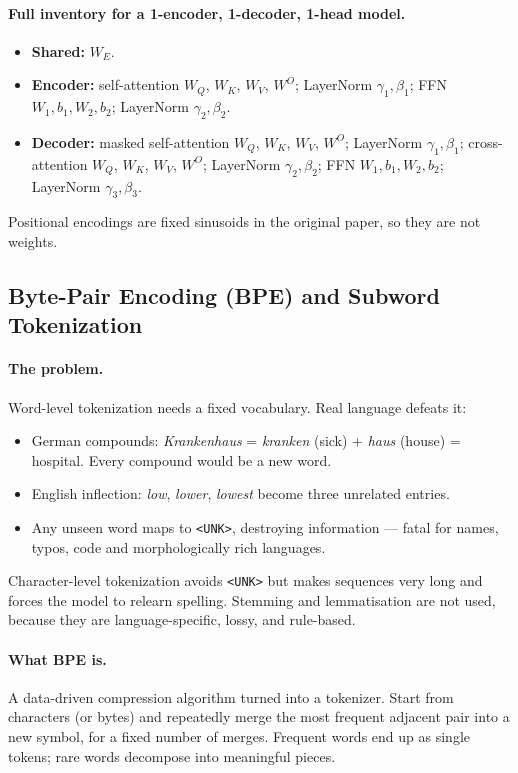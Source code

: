 \documentclass[11pt,a4paper]{article}
\begin{document}
\paragraph{Full inventory for a 1-encoder, 1-decoder, 1-head model.}
\begin{itemize}
\item \textbf{Shared:} $W_E$.
\item \textbf{Encoder:} self-attention $W_Q$, $W_K$, $W_V$, $W^O$; LayerNorm
  $\gamma_1, \beta_1$; FFN $W_1, b_1, W_2, b_2$; LayerNorm $\gamma_2, \beta_2$.
\item \textbf{Decoder:} masked self-attention $W_Q$, $W_K$, $W_V$, $W^O$; LayerNorm
  $\gamma_1, \beta_1$; cross-attention $W_Q$, $W_K$, $W_V$, $W^O$; LayerNorm
  $\gamma_2, \beta_2$; FFN $W_1, b_1, W_2, b_2$; LayerNorm $\gamma_3, \beta_3$.
\end{itemize}
Positional encodings are fixed sinusoids in the original paper, so they are not weights.

\subsection{Byte-Pair Encoding (BPE) and Subword Tokenization}

\paragraph{The problem.} Word-level tokenization needs a fixed vocabulary. Real language
defeats it:
\begin{itemize}
\item German compounds: \emph{Krankenhaus} = \emph{kranken} (sick) + \emph{haus} (house)
  = hospital. Every compound would be a new word.
\item English inflection: \emph{low}, \emph{lower}, \emph{lowest} become three unrelated
  entries.
\item Any unseen word maps to \texttt{<UNK>}, destroying information --- fatal for names,
  typos, code and morphologically rich languages.
\end{itemize}
Character-level tokenization avoids \texttt{<UNK>} but makes sequences very long and forces
the model to relearn spelling. Stemming and lemmatisation are not used, because they are
language-specific, lossy, and rule-based.

\paragraph{What BPE is.} A data-driven compression algorithm turned into a tokenizer. Start
from characters (or bytes) and repeatedly merge the most frequent adjacent pair into a new
symbol, for a fixed number of merges. Frequent words end up as single tokens; rare words
decompose into meaningful pieces.
\end{document}
